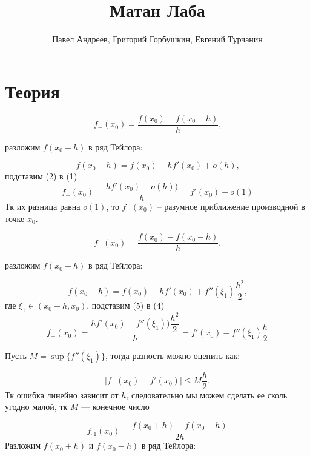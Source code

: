 \documentclass{report}
\title{\Huge{Матан Лаба}}
\author{\huge{Павел Андреев, Григорий Горбушкин, Евгений Турчанин}}
\date{}
\begin{document}
\maketitle


\section{\textbf{Теория}}
\begin{equation}
  f_-(x_0)=\dfrac{f(x_0)-f(x_0-h)}{h}\text{,}
\end{equation}

разложим $f(x_0-h)$ в ряд Тейлора:

\begin{equation}
  f(x_0-h)=f(x_0)-hf'(x_0)+o(h)\text{,}
\end{equation}
подставим (2) в (1)
\begin{equation}
f_-(x_0)=\dfrac{hf'(x_0)-o(h))}{h}=f'(x_0)-o(1)
\end{equation}
Тк их разница равна $o(1)$, то $f_-(x_0)$ – разумное приближение производной в точке $x_0$.


\begin{equation}
  f_-(x_0)=\dfrac{f(x_0)-f(x_0-h)}{h}\text{,}
\end{equation}

разложим $f(x_0-h)$ в ряд Тейлора:

\begin{equation}
  f(x_0-h)=f(x_0)-hf'(x_0)+f''(\xi_1)\dfrac{h^2}{2}\text{,}
\end{equation}
где $\xi_1 \in (x_0-h,x_0)$, подставим (5) в (4)
\begin{equation}
  f_-(x_0)=\dfrac{hf'(x_0)-f''(\xi_1))\dfrac{h^2}{2}}{h}=f'(x_0)-f''(\xi_1)\dfrac{h}{2}
\end{equation}

Пусть $M=\sup \{f''(\xi_1)\}$, тогда разность можно оценить как:

\begin{equation}
|f_-(x_0)-f'(x_0)|\leq M\dfrac{h}{2}\text{.}
\end{equation}
Тк ошибка линейно зависит от $h$, следовательно мы можем сделать ее сколь угодно малой, тк $M$ --- конечное число

\begin{equation}
  f_{\circ 1}(x_0)=\dfrac{f(x_0+h)-f(x_0-h)}{2h}
\end{equation}
Разложим $f(x_0+h)$ и $f(x_0-h)$ в ряд Тейлора:
\end{document}

